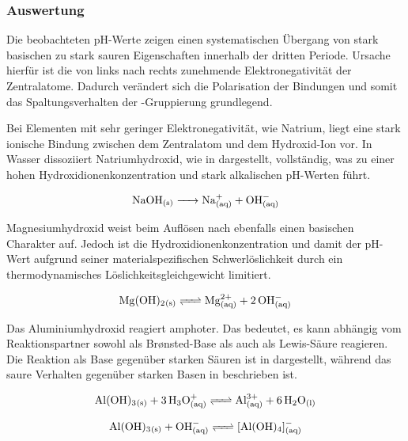 \subsubsection{Auswertung}
Die beobachteten pH-Werte zeigen einen systematischen Übergang von stark basischen zu stark sauren Eigenschaften innerhalb der dritten Periode. Ursache hierfür ist die von links nach rechts zunehmende Elektronegativität der Zentralatome. Dadurch verändert sich die Polarisation der Bindungen und somit das Spaltungsverhalten der -Gruppierung grundlegend.

Bei Elementen mit sehr geringer Elektronegativität, wie Natrium, liegt eine stark ionische Bindung zwischen dem Zentralatom und dem Hydroxid-Ion vor. In Wasser dissoziiert Natriumhydroxid, wie in  dargestellt, vollständig, was zu einer hohen Hydroxidionenkonzentration und stark alkalischen pH-Werten führt.

\begin{equation}
    \ce{NaOH_{(s)} -> Na^+_{(aq)} + OH^-_{(aq)}}
    \label{eq:naoh_dissoziation}
\end{equation}

Magnesiumhydroxid weist beim Auflösen nach  ebenfalls einen basischen Charakter auf. Jedoch ist die Hydroxidionenkonzentration und damit der pH-Wert aufgrund seiner materialspezifischen Schwerlöslichkeit durch ein thermodynamisches Löslichkeitsgleichgewicht limitiert.

\begin{equation}
    \ce{Mg(OH)2_{(s)} <=> Mg^{2+}_{(aq)} + 2OH^-_{(aq)}}
    \label{eq:mgoh2_gleichgewicht}
\end{equation}

Das Aluminiumhydroxid reagiert amphoter. Das bedeutet, es kann abhängig vom Reaktionspartner sowohl als Brønsted-Base als auch als Lewis-Säure reagieren. Die Reaktion als Base gegenüber starken Säuren ist in  dargestellt, während das saure Verhalten gegenüber starken Basen in  beschrieben ist.

\begin{equation}
    \ce{Al(OH)3_{(s)} + 3H3O^+_{(aq)} <=> Al^{3+}_{(aq)} + 6H2O_{(l)}}
    \label{eq:aloh3_base_reaction}
\end{equation}

\begin{equation}
    \ce{Al(OH)3_{(s)} + OH^-_{(aq)} <=> [Al(OH)4]^-_{(aq)}}
    \label{eq:aloh3_acid_reaction}
\end{equation}

